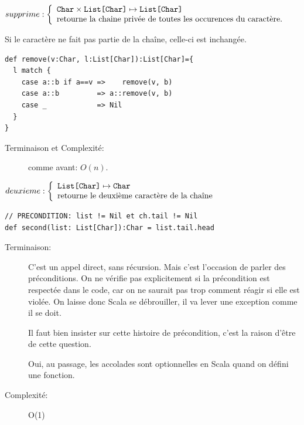 \documentclass[10pt]{article}\usepackage[correction,nu]{esial}
\begin{document}
\begin{Question}
  $supprime: \left\{
    \begin{array}{l}
      \text{\texttt{Char}}\times\text{\texttt{List[Char]}} \mapsto \text{\texttt{List[Char]}}\\
      \text{retourne la chaine privée de toutes les occurences du caractère.}
    \end{array}\right.$  

  Si le caractère ne fait pas partie de la chaîne, celle-ci est inchangée.
\end{Question}
\begin{Reponse}
  \begin{Verbatim}
def remove(v:Char, l:List[Char]):List[Char]={
  l match {
    case a::b if a==v =>    remove(v, b)
    case a::b         => a::remove(v, b)
    case _            => Nil
  }
}    
  \end{Verbatim}
  \begin{description}
  \item[Terminaison et Complexité:] comme avant: $O(n)$. 
  \end{description}
\end{Reponse}

\begin{Question}
  $deuxieme: \left\{
    \begin{array}{l}
      \text{\texttt{List[Char]}}\mapsto \text{\texttt{Char}}\\
      \text{retourne le deuxième caractère de la chaîne}
    \end{array}\right.$  
\end{Question}
\begin{Reponse}
  \begin{Verbatim}[]
// PRECONDITION: list != Nil et ch.tail != Nil
def second(list: List[Char]):Char = list.tail.head
  \end{Verbatim}
  \begin{description}
  \item[Terminaison:] C'est un appel direct, sans récursion. Mais c'est
    l'occasion de parler des préconditions.  On ne vérifie pas explicitement si
    la précondition est respectée dans le code, car on ne saurait pas trop
    comment réagir si elle est violée. On laisse donc Scala se débrouiller, il
    va lever une exception comme il se doit. 

    Il faut bien insister sur cette histoire de précondition, c'est la raison
    d'être de cette question.

    Oui, au passage, les accolades sont optionnelles en Scala quand on défini
    une fonction.
  \item[Complexité:] O(1)
  \end{description}
\end{Reponse}
\end{document}
